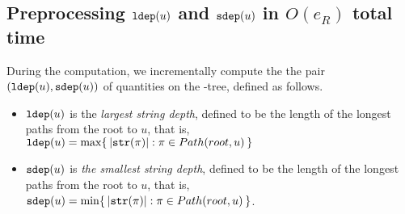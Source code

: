 


\subsection{Preprocessing $\mathtt{ldep}(u)$ and $\mathtt{sdep}(u)$ in $O(e_R)$ total time}
\label{sec:compute:cdawg:preprocess}

During the computation, we incrementally compute the the pair $(\mathtt{ldep}(u), \mathtt{sdep}(u))$ of quantities on the \LPTrm-tree, defined as follows. 
\begin{itemize}
\item $\mathtt{ldep}(u)$ is the \textit{largest string depth}, defined to be the length of the longest paths from the root to $u$,
that is, $\mathtt{ldep}(u) = \max \{\kern0.2em |\mathtt{str}(\pi)| : \pi \in Path(root, u) \kern0.2em\}$

\item $\mathtt{sdep}(u)$ is \textit{the smallest string depth}, defined to be the length of the longest paths from the root to $u$, that is, $\mathtt{sdep}(u) = \min \{\kern0.2em |\mathtt{str}(\pi)| : \pi \in Path(root, u) \kern0.2em\}$. 
\end{itemize}


